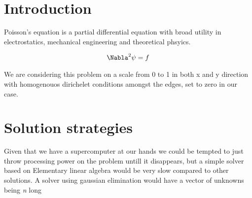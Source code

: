 \section{Introduction}
Poisson's equation is a partial differential equation with broad utility in
electrostatics, mechanical engineering and theoretical phsyics.\cite{wiki}

\begin{align}
	\Nabla^2 \psi &= f \\
\end{align}

We are considering this problem on a scale from 0 to 1 in both x and y
direction with homogenouos dirichelet conditions amongst the edges, set to zero
in our case. 

\section{Solution strategies}
Given that we have a supercomputer at our hands we could be tempted to just
throw processing power on the problem untill it disappears, but a simple solver
based on Elementary linear algebra would be very slow compared to other
solutions. A solver using gaussian elimination would have a vector of unknowns being \emph{n} long
